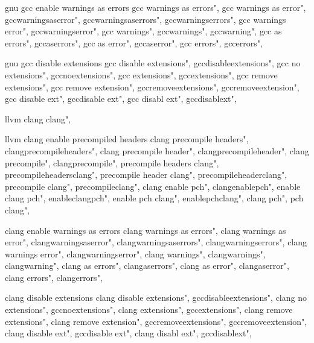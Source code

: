          gnu gcc enable warnings as errors
        gcc warnings as errors", 
        gcc warnings as error", 
        gccwarningsaserror", 
        gccwarningsaserrors", 
        gccwarningserrors", 
        gcc warnings error", 
        gccwarningserror", 
        gcc warnings", 
        gccwarnings", 
        gccwarning", 
        gcc as errors", 
        gccaserrors", 
        gcc as error", 
        gccaserror", 
        gcc errors", 
        gccerrors", 
        
         gnu gcc disable extensions 
        gcc disable extensions", 
        gccdisableextensions", 
        gcc no extensions", 
        gccnoextensions", 
        gcc extensions", 
        gccextensions", 
        gcc remove extensions", 
        gcc remove extension", 
        gccremoveextensions", 
        gccremoveextension", 
        gcc disable ext", 
        gccdisable ext", 
        gcc disabl ext", 
        gccdisablext", 
        
         llvm clang 
        clang",  
        
         llvm clang enable precompiled headers 
        clang precompile headers",  
        clangprecompileheaders",  
        clang precompile header",  
        clangprecompileheader",  
        clang precompile",  
        clangprecompile",  
        precompile headers clang",  
        precompileheadersclang",  
        precompile header clang",  
        precompileheaderclang",  
        precompile clang",  
        precompileclang",  
        clang enable pch",  
        clangenablepch",  
        enable clang pch",  
        enableclangpch",  
        enable pch clang",  
        enablepchclang",  
        clang pch",  
        pch clang",  
        
         clang enable warnings as errors
        clang warnings as errors", 
        clang warnings as error", 
        clangwarningsaserror", 
        clangwarningsaserrors", 
        clangwarningserrors", 
        clang warnings error", 
        clangwarningserror", 
        clang warnings", 
        clangwarnings", 
        clangwarning", 
        clang as errors", 
        clangaserrors", 
        clang as error", 
        clangaserror", 
        clang errors", 
        clangerrors", 
        
         clang disable extensions 
        clang disable extensions", 
        gccdisableextensions", 
        clang no extensions", 
        gccnoextensions", 
        clang extensions", 
        gccextensions", 
        clang remove extensions", 
        clang remove extension", 
        gccremoveextensions", 
        gccremoveextension", 
        clang disable ext", 
        gccdisable ext", 
        clang disabl ext", 
        gccdisablext", 
        
